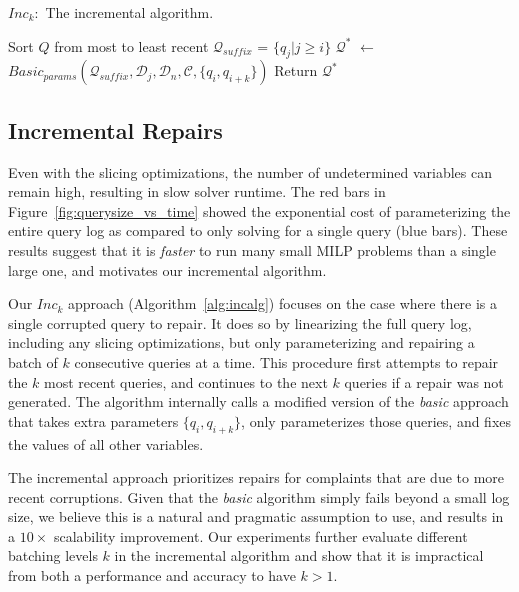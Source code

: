 \begin{algorithm}[t]
\caption{$Inc_k:$ The incremental algorithm. 
}
\scriptsize
\label{alg:incalg}
\begin{algorithmic}[2]
\STATE Sort $Q$ from most to least recent
  \STATE $\mathcal{Q}_{suffix}$ = $\{q_j | j \ge i \}$ 
  \STATE $\mathcal{Q}^*$ $\leftarrow$ $Basic_{params}(\mathcal{Q}_{suffix}, \mathcal{D}_j, \mathcal{D}_n, \mathcal{C}, \{q_i, q_{i+k}\})$
    \STATE Return $\mathcal{Q}^*$
  \ENDIF
\ENDFOR
\end{algorithmic}
\end{algorithm}

\subsection{Incremental Repairs}\label{sec:incremental}



Even with the slicing optimizations, the number of undetermined variables can remain high, resulting in slow solver runtime.  
The red bars in Figure~\ref{fig:querysize_vs_time} showed the exponential cost of parameterizing the entire query log as compared to only solving for a single query (blue bars).
These results suggest that it is \emph{faster} to run many small MILP problems than a single large one, and motivates our incremental algorithm.

Our \emph{$Inc_k$} approach (Algorithm~\ref{alg:incalg}) focuses on the case where there is a single corrupted query to repair.
It does so by linearizing the full query log, including any slicing optimizations, but only parameterizing and repairing a batch of $k$ consecutive queries at a time. 
This procedure first attempts to repair the $k$ most recent queries, and continues to the next $k$ queries if a repair was not generated.
The algorithm internally calls a modified version of the \emph{basic} approach that takes extra parameters $\{q_i, q_{i+k}\}$, only parameterizes those queries, and fixes the values of all other variables.

The incremental approach prioritizes repairs for complaints that are due to more recent corruptions.
Given that the \emph{basic} algorithm simply fails beyond a small log size, we believe this is a natural and pragmatic assumption to use, and results in 
a $10\times$ scalability improvement.
Our experiments further evaluate different batching levels $k$ in the incremental algorithm and show that it is impractical from both a performance and accuracy to have $k > 1$.






